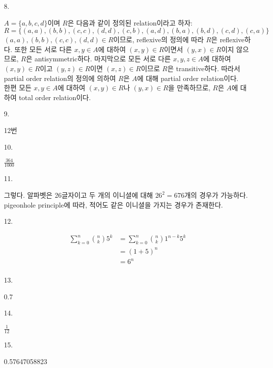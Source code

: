 \documentclass{article}
\begin{document}
8.
\begin{addmargin}[1em]{2em}
$A=\{a,b,c,d\}$이며 $R$은 다음과 같이 정의된 relation이라고 하자: 
\[R = \{(a, a), (b, b), (c, c), (d, d), (c, b), (a, d), (b, a), (b, d), (c, d), (c, a) \} \]
$(a,a), (b,b), (c,c), (d,d)\in R$이므로, reflexive의 정의에 따라 $R$은 reflexive하다. 또한 모든 서로 다른 $x,y\in A$에 대하여 $(x,y)\in R$이면서 $(y,x)\in R$이지 않으므로, $R$은 antisymmetric하다. 마지막으로 모든 서로 다른 $x,y,z\in A$에 대하여 $(x,y)\in R$이고 $(y,z)\in R$이면 $(x,z)\in R$이므로 $R$은 transitive하다. 따라서 partial order relation의 정의에 의하여 $R$은 $A$에 대해  partial order relation이다. \\
한편 모든 $x,y\in A$에 대하여 $(x,y)\in R$나 $(y,x)\in R$을 만족하므로, $R$은 $A$에 대하여 total order relation이다.

\end{addmargin}
\bigskip

9.
\begin{addmargin}[1em]{2em}
12번
\end{addmargin}
\bigskip

10.
\begin{addmargin}[1em]{2em}
$\frac{364}{1000}$
\end{addmargin}
\bigskip

11.
\begin{addmargin}[1em]{2em}
그렇다. 알파벳은 26글자이고 두 개의 이니셜에 대해 $26^2 = 676$개의 경우가 가능하다. pigeonhole principle에 따라, 적어도 같은 이니셜을 가지는 경우가 존재한다.
\end{addmargin}
\bigskip

12.
\begin{addmargin}[1em]{2em}
\begin{align*}
    \sum_{k=0}^n{n \choose k}5^k &= \sum_{k=0}^n{n \choose k}1^{n-k} 5^k \\
    &=(1+5)^n \\
    &=6^n \\
\end{align*}
\end{addmargin}
\bigskip

13.
\begin{addmargin}[1em]{2em}
0.7
\end{addmargin}
\bigskip

14.
\begin{addmargin}[1em]{2em}
$\frac{1}{12}$
\end{addmargin}
\bigskip

15.
\begin{addmargin}[1em]{2em}
0.57647058823
\end{addmargin}
\bigskip
\end{document}
